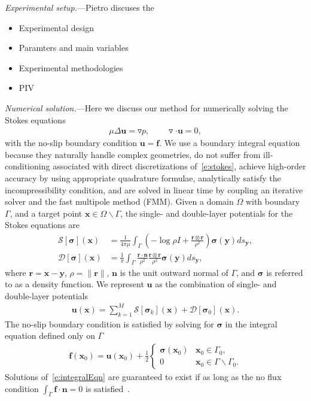 \documentclass[twocolumn,showpacs,pre,preprintnumbers,floatfix]{revtex4-1}
\newcommand{\ff}{{\mathbf{f}}}
\newcommand{\nn}{{\mathbf{n}}}
\newcommand{\rr}{{\mathbf{r}}}
\newcommand{\ssigma}{{\boldsymbol{\sigma}}}
\newcommand{\uu}{{\mathbf{u}}}
\newcommand{\xx}{{\mathbf{x}}}
\newcommand{\yy}{{\mathbf{y}}}
\newcommand{\grad}{{\triangledown}}
\renewcommand{\SS}{{\mathcal{S}}}
\newcommand{\DD}{{\mathcal{D}}}
\begin{document}
{\em Experimental setup.}---Pietro discuses the
\begin{itemize}
  \item Experimental design
  \item Paramters and main variables
  \item Experimental methodologies
  \item PIV
\end{itemize}

{\em Numerical solution.}---Here we discuss our method for numerically
solving the Stokes equations
\begin{align}
  \mu \Delta \uu  = \grad p, \qquad \grad \cdot \uu = 0,
  \label{e:stokes}
\end{align}
with the no-slip boundary condition $\uu = \ff$.  We use a boundary
integral equation because they naturally handle complex geometries, do
not suffer from ill-conditioning associated with direct discretizations
of~\eqref{e:stokes}, achieve high-order accuracy by using appropriate
quadrature formulae, analytically satisfy the incompressibility
condition, and are solved in linear time by coupling an iterative
solver and the fast multipole method (FMM).  Given a domain $\Omega$
with boundary $\Gamma$, and a target point $\xx \in \Omega \backslash
\Gamma$, the single- and double-layer potentials for the Stokes
equations are~\cite{poz1992}
\begin{align*}
  \SS[\ssigma](\xx) &= \frac{1}{4\pi\mu}\int_{\Gamma} \left(
  -\log\rho I + \frac{\rr \otimes\rr}{\rho^{2}} 
  \right)\ssigma(\yy)ds_{\yy},  \\
  \DD[\ssigma](\xx) &= \frac{1}{\pi}\int_{\Gamma} 
  \frac{\rr \cdot \nn}{\rho^{2}}\frac{\rr \otimes \rr}{\rho^{2}}
  \ssigma(\yy)ds_{\yy},
\end{align*}
where $\rr = \xx - \yy$, $\rho = \|\rr\|$, $\nn$ is the unit outward
normal of $\Gamma$, and $\ssigma$ is referred to as a density
function.  We represent $\uu$ as the combination of single- and
double-layer potentials
\begin{align}
  \uu(\xx) = \sum_{k=1}^{M} \SS[\ssigma_{k}](\xx) + 
    \DD[\ssigma_{0}](\xx).
  \label{e:integralRep}
\end{align}
The no-slip boundary condition is satisfied by solving for $\ssigma$ in
the integral equation defined only on $\Gamma$
\begin{align}
  \ff(\xx_{0}) = \uu(\xx_{0}) + \frac{1}{2}\left\{
    \begin{array}{cl}
      \ssigma(\xx_{0}) & \xx_{0} \in \Gamma_{0}, \\
      0 & \xx_{0} \in \Gamma \backslash \Gamma_{0}.
    \end{array}
    \right. 
    \label{e:integralEqn}
\end{align}
Solutions of~\eqref{e:integralEqn} are guaranteed to exist if as long as
the no flux condition $\int_{\Gamma} \ff \cdot \nn=0$ is
satisfied~\cite{poz1992}.
\end{document}
